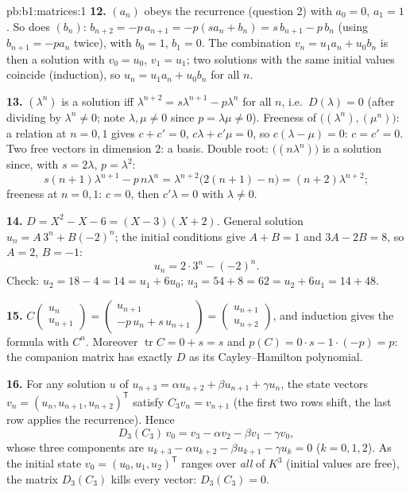 \begin{solution}{pb:b1:matrices:1}
\textbf{12.} $(a_n)$ obeys the recurrence (question 2) with $a_0
= 0$, $a_1 = 1$. So does $(b_n)$: $b_{n+2} = -p\,a_{n+1} =
-p(s a_n + b_n) = s\,b_{n+1} - p\,b_n$ (using $b_{n+1} = -pa_n$
twice), with $b_0 = 1$, $b_1 = 0$. The combination $v_n =
u_1 a_n + u_0 b_n$ is then a solution with $v_0 = u_0$, $v_1 =
u_1$; two solutions with the same initial values coincide
(induction), so $u_n = u_1 a_n + u_0 b_n$ for all $n$.

\textbf{13.} $(\lambda^n)$ is a solution iff $\lambda^{n+2} =
s\lambda^{n+1} - p\lambda^n$ for all $n$, i.e.\ $D(\lambda) = 0$
(after dividing by $\lambda^n \neq 0$; note $\lambda, \mu \neq
0$ since $p = \lambda\mu \neq 0$). Freeness of
$\bigl((\lambda^n), (\mu^n)\bigr)$: a relation at $n = 0, 1$
gives $c + c' = 0$, $c\lambda + c'\mu = 0$, so $c(\lambda - \mu)
= 0$: $c = c' = 0$. Two free vectors in dimension $2$: a basis.
Double root: $\bigl((n\lambda^n)\bigr)$ is a solution since,
with $s = 2\lambda$, $p = \lambda^2$:
\[
s(n+1)\lambda^{n+1} - p\,n\lambda^n
= \lambda^{n+2}\bigl(2(n+1) - n\bigr) = (n+2)\lambda^{n+2} ;
\]
freeness at $n = 0, 1$: $c = 0$, then $c'\lambda = 0$ with
$\lambda \neq 0$.

\textbf{14.} $D = X^2 - X - 6 = (X - 3)(X + 2)$. General
solution $u_n = A\,3^n + B(-2)^n$; the initial conditions give
$A + B = 1$ and $3A - 2B = 8$, so $A = 2$, $B = -1$:
\[
u_n = 2\cdot 3^n - (-2)^n .
\]
Check: $u_2 = 18 - 4 = 14 = u_1 + 6u_0$; $u_3 = 54 + 8 = 62 =
u_2 + 6u_1 = 14 + 48$.

\textbf{15.} $C\begin{pmatrix} u_n\\ u_{n+1}\end{pmatrix} =
\begin{pmatrix} u_{n+1}\\ -p\,u_n + s\,u_{n+1}\end{pmatrix} =
\begin{pmatrix} u_{n+1}\\ u_{n+2}\end{pmatrix}$, and induction
gives the formula with $C^n$. Moreover $\operatorname{tr} C = 0
+ s = s$ and $p(C) = 0\cdot s - 1\cdot(-p) = p$: the companion
matrix has exactly $D$ as its Cayley--Hamilton polynomial.

\textbf{16.} For any solution $u$ of $u_{n+3} = \alpha u_{n+2} +
\beta u_{n+1} + \gamma u_n$, the state vectors $v_n = (u_n,
u_{n+1}, u_{n+2})^{\mathsf T}$ satisfy $C_3 v_n = v_{n+1}$
(the first two rows shift, the last row applies the
recurrence). Hence
\[
D_3(C_3)\,v_0 = v_3 - \alpha v_2 - \beta v_1 - \gamma v_0 ,
\]
whose three components are $u_{k+3} - \alpha u_{k+2} - \beta
u_{k+1} - \gamma u_k = 0$ ($k = 0, 1, 2$). As the initial state
$v_0 = (u_0, u_1, u_2)^{\mathsf T}$ ranges over \emph{all} of
$K^3$ (initial values are free), the matrix $D_3(C_3)$ kills
every vector: $D_3(C_3) = 0$.


\end{solution}
